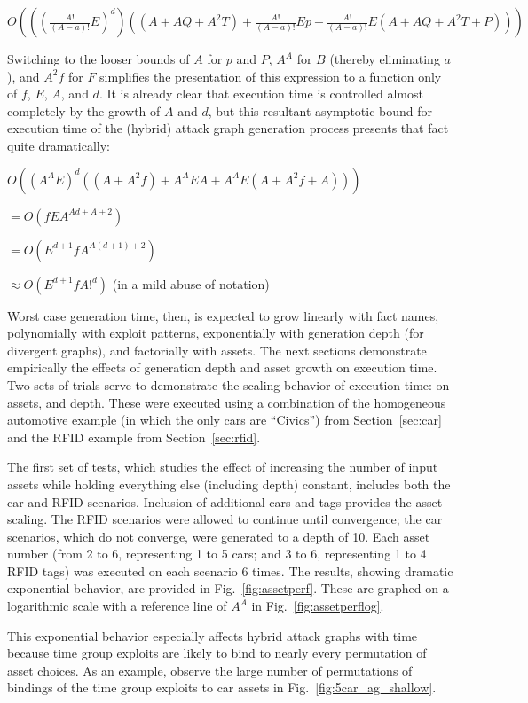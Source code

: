$O(((\frac{A!}{(A-a)!}E)^d)((A+AQ + A^2T) + \frac{A!}{(A-a)!}Ep + \frac{A!}{(A-a)!}E(A+AQ + A^2T+P)))$

Switching to the looser bounds of $A$ for $p$ and $P$, $A^A$ for $B$ 
(thereby eliminating $a$), and $A^2f$ for $F$
simplifies the presentation of this expression to a function only of $f$,
$E$, $A$, and $d$. It is already clear that execution time is controlled almost
completely by the growth of $A$ and $d$, but this resultant asymptotic bound for
execution time of the (hybrid) attack graph generation process presents that 
fact quite dramatically:

$O((A^AE)^d((A+A^2f) + A^AEA + A^AE(A+A^2f+A)))$

$= O(fEA^{Ad+A+2})$

$= O(E^{d+1}fA^{A(d+1)+2})$

$\approx O(E^{d+1}fA!^{d})$ (in a mild abuse of notation)

Worst case generation time, then, is expected to grow linearly with fact names, 
polynomially with exploit patterns, exponentially with generation depth (for divergent 
graphs), and factorially with assets. The next sections demonstrate empirically
the effects of generation depth and asset growth on execution time.
Two sets of trials serve to demonstrate the scaling behavior of execution time:
on assets, and depth. These were executed using a combination of the 
homogeneous automotive example (in which the only cars are ``Civics'') from
Section~\ref{sec:car} and the RFID example from Section~\ref{sec:rfid}.

The first set of tests, which studies the effect of increasing the number of 
input assets while holding everything else (including depth) constant,
includes both the car and RFID scenarios. Inclusion of additional cars and
tags provides the asset scaling. The RFID scenarios were allowed to continue
until convergence; the car scenarios, which do not converge, were generated
to a depth of 10. Each asset number (from 2 to 6, representing 1 to 5 cars; and
3 to 6, representing 1 to 4 RFID tags) was executed on each scenario 6 times.
The results, showing dramatic exponential behavior, are provided in 
Fig.~\ref{fig:assetperf}. These are graphed on a logarithmic scale with a
reference line of $A^A$ in Fig.~\ref{fig:assetperflog}.

This exponential behavior especially affects hybrid attack graphs with time 
because time group exploits are likely to bind to nearly every permutation of 
asset choices. As an example, observe the large number of permutations of 
bindings of the time group exploits to car assets in 
Fig.~\ref{fig:5car_ag_shallow}.

